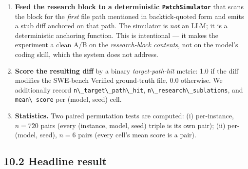 \begin{enumerate}
  \begin{itemize}
  \tightlist
  \item
    \textbf{\passthrough{\lstinline!with\_harness!} arm.} Insert every snippet via \passthrough{\lstinline!context\_insert!}; trigger \passthrough{\lstinline!sublate\_with\_evidence!} for every stale-vs-fresh pair via the dominance rule; then assemble the block from \passthrough{\lstinline!live!} items only, truncating from the end if the budget is exceeded.
  \item
    \textbf{\passthrough{\lstinline!without\_harness!} arm.} Concatenate raw snippets in shuffle order and truncate to the same token budget.
  \end{itemize}
\item
  \textbf{Feed the research block to a deterministic \passthrough{\lstinline!PatchSimulator!}} that scans the block for the \emph{first} file path mentioned in backtick-quoted form and emits a stub diff anchored on that path. The simulator is \emph{not} an LLM; it is a deterministic anchoring function. This is intentional --- it makes the experiment a clean A/B on the \emph{research-block contents}, not on the model's coding skill, which the system does not address.
\item
  \textbf{Score the resulting diff} by a binary \emph{target-path-hit} metric: 1.0 if the diff modifies the SWE-bench Verified ground-truth file, 0.0 otherwise. We additionally record \passthrough{\lstinline!n\_target\_path\_hit!}, \passthrough{\lstinline!n\_research\_sublations!}, and \passthrough{\lstinline!mean\_score!} per (model, seed) cell.
\item
  \textbf{Statistics.} Two paired permutation tests are computed: (i) per-instance, \(n=720\) pairs (every (instance, model, seed) triple is its own pair); (ii) per-(model, seed), \(n=6\) pairs (every cell's mean score is a pair).
\end{enumerate}

\subsection{10.2 Headline result}\label{headline-result}

